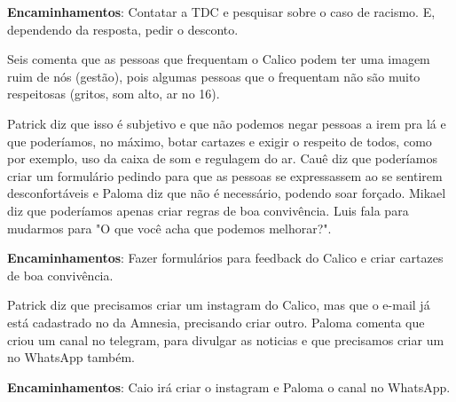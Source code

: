 \documentclass{ata-calico}
\begin{document}
\textbf{Encaminhamentos}: Contatar a TDC e pesquisar sobre o caso de racismo. E, dependendo da resposta, pedir o desconto.

Seis comenta que as pessoas que frequentam o Calico podem ter uma imagem ruim de nós (gestão), pois algumas pessoas que o frequentam não são muito respeitosas (gritos, som alto, ar no 16).

Patrick diz que isso é subjetivo e que não podemos negar pessoas a irem pra lá e que poderíamos, no máximo, botar cartazes e exigir o respeito de todos, como por exemplo, uso da caixa de som e regulagem do ar. Cauê diz que poderíamos criar um formulário pedindo para que as pessoas se expressassem ao se sentirem desconfortáveis e Paloma diz que não é necessário, podendo soar forçado. Mikael diz que poderíamos apenas criar regras de boa convivência. Luis fala para mudarmos para "O que você acha que podemos melhorar?".\newline


\textbf{Encaminhamentos}: Fazer formulários para feedback do Calico e criar cartazes de boa convivência.

Patrick diz que precisamos criar um instagram do Calico, mas que o e-mail já está cadastrado no da Amnesia, precisando criar outro. Paloma comenta que criou um canal no telegram, para divulgar as noticias e que precisamos criar um no WhatsApp também.\newline

\textbf{Encaminhamentos}: Caio irá criar o instagram e Paloma o canal no WhatsApp.


\end{document}
